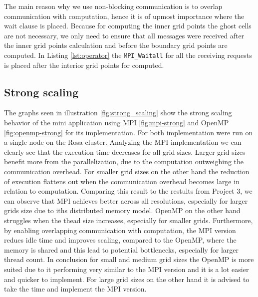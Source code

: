 The main reason why we use non-blocking communication is to overlap communication with computation, hence it is of upmost importance where the wait clause is placed. Because for computing the inner grid points the ghost cells are not necessary, we only need to ensure that all messages were received after the inner grid points calculation and before the boundary grid points are computed. In Listing \ref{lst:operator} the \texttt{MPI\_Waitall} for all the receiving requests is placed after the interior grid points for computed.
\subsection{Strong scaling}
The graphs seen in illustration \ref{fig:strong_scaling} show the strong scaling behavior of the mini application using MPI \ref{fig:mpi-strong} and OpenMP \ref{fig:openmp-strong} for its implementation. For both implementation were run on a single node on the Rosa cluster. Analyzing the MPI implementation we can clearly see that the execution time decreases for all grid sizes. Larger grid sizes benefit more from the parallelization, due to the computation outweighing the communication overhead. For smaller grid sizes on the other hand the reduction of execution flattens out when the communication overhead becomes large in relation to computation.\newline
Comparing this result to the restults from Project 3, we can observe that MPI achieves better across all resolutions, especially for larger grids size due to iths distributed memory model. OpenMP on the other hand struggles when the thead size increases, especially for smaller grids. Furthermore, by enabling overlapping communication with computation, the MPI version redues idle time and improves scaling, compared to the OpenMP, where the memory is shared and this lead to potential bottlenecks, especially for larger thread count.
In conclusion for small and medium grid sizes the OpenMP is more suited due to it performing very similar to the MPI version and it is a lot easier and quicker to implement. For large grid sizes on the other hand it is advised to take the time and implement the MPI version.

